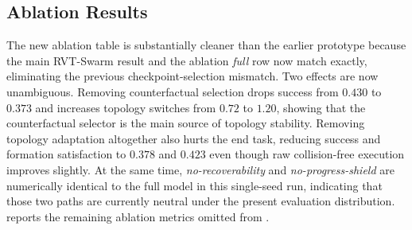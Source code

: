 \documentclass[journal]{IEEEtran}
\begin{document}
\subsection{Ablation Results}
\label{sec:ablation}

\begin{table}[H]
\centering
\caption{Ablation results for RVT-Swarm. In the best archived RVT report
reported in this paper, topology adaptation and counterfactual
selection provide the clearest gains, while the scalar recoverability
and progress-shield toggles are effectively neutral.}
\label{tab:ablation}
\scriptsize
{}
\end{table}

The new ablation table is substantially cleaner than the earlier
prototype because the main RVT-Swarm result and the ablation
\emph{full} row now match exactly, eliminating the previous
checkpoint-selection mismatch. Two effects are now unambiguous.
Removing counterfactual selection drops success from $0.430$ to $0.373$
and increases topology switches from $0.72$ to $1.20$, showing that the
counterfactual selector is the main source of topology stability.
Removing topology adaptation altogether also hurts the end task,
reducing success and formation satisfaction to $0.378$ and $0.423$ even
though raw collision-free execution improves slightly. At the same time,
\emph{no-recoverability} and \emph{no-progress-shield} are numerically
identical to the full model in this single-seed run, indicating that
those two paths are currently neutral under the present evaluation
distribution. 
reports the remaining ablation metrics omitted from
.
\end{document}
